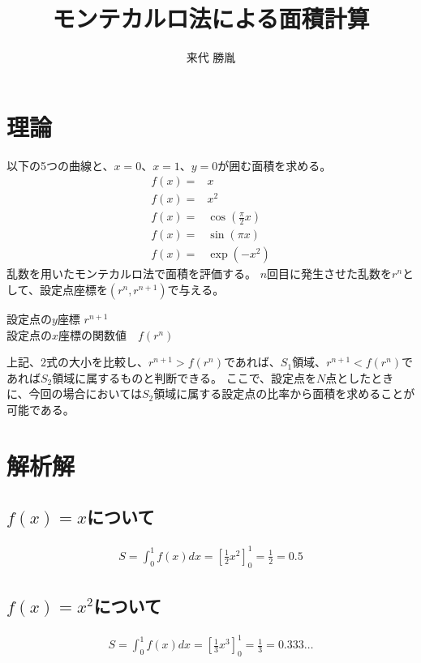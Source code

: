 \documentclass[12pt,a4paper]{jsarticle}
\author{来代 勝胤}
\title{モンテカルロ法による面積計算}
\begin{document}
\maketitle
\thispagestyle{empty}
\clearpage
\addtocounter{page}{-1}

\section{理論}
以下の5つの曲線と、$x=0$、$x=1$、$y=0$が囲む面積を求める。
\begin{eqnarray}
    f(x)=&x\\
    f(x)=&x^2\\
    f(x)=&\cos\left(\frac{\pi}{2}x\right)\\
    f(x)=&\sin\left(\pi x\right) \\
    f(x)=&\exp\left(-x^2\right)
\end{eqnarray}
乱数を用いたモンテカルロ法で面積を評価する。
$n$回目に発生させた乱数を$r^n$として、設定点座標を$\left(r^n, r^{n+1}\right)$で与える。\\
\begin{center}
    設定点の$y$座標          $r^{n+1}$\\
    設定点の$x$座標の関数値　$f\left(r^n\right)$
\end{center}
上記、2式の大小を比較し、$r^{n+1}>f(r^n)$であれば、$S_1$領域、$r^{n+1}<f(r^n)$であれば$S_2$領域に属するものと判断できる。
ここで、設定点を$N$点としたときに、今回の場合においては$S_2$領域に属する設定点の比率から面積を求めることが可能である。\\
\section{解析解}
\subsection{$f\left(x\right)=x$について}
\begin{eqnarray}
    S=\int_0^1f\left(x\right)dx=\left[\frac{1}{2}x^2\right]_0^1=\frac{1}{2}=0.5
\end{eqnarray}
\subsection{$f\left(x\right)=x^2$について}
\begin{eqnarray}
    S=\int_0^1f\left(x\right)dx=\left[\frac{1}{3}x^3\right]_0^1=\frac{1}{3}=0.333\dots
\end{eqnarray}
\end{document}

